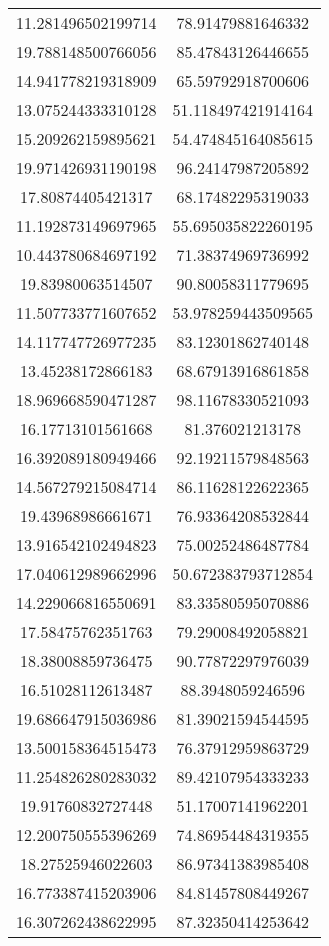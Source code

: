 \begin{table}
\begin{tabular}{cc}
11.281496502199714 & 78.91479881646332 \\
19.788148500766056 & 85.47843126446655 \\
14.941778219318909 & 65.59792918700606 \\
13.075244333310128 & 51.118497421914164 \\
15.209262159895621 & 54.474845164085615 \\
19.971426931190198 & 96.24147987205892 \\
17.80874405421317 & 68.17482295319033 \\
11.192873149697965 & 55.695035822260195 \\
10.443780684697192 & 71.38374969736992 \\
19.83980063514507 & 90.80058311779695 \\
11.507733771607652 & 53.978259443509565 \\
14.117747726977235 & 83.12301862740148 \\
13.45238172866183 & 68.67913916861858 \\
18.969668590471287 & 98.11678330521093 \\
16.17713101561668 & 81.376021213178 \\
16.392089180949466 & 92.19211579848563 \\
14.567279215084714 & 86.11628122622365 \\
19.43968986661671 & 76.93364208532844 \\
13.916542102494823 & 75.00252486487784 \\
17.040612989662996 & 50.672383793712854 \\
14.229066816550691 & 83.33580595070886 \\
17.58475762351763 & 79.29008492058821 \\
18.38008859736475 & 90.77872297976039 \\
16.51028112613487 & 88.3948059246596 \\
19.686647915036986 & 81.39021594544595 \\
13.500158364515473 & 76.37912959863729 \\
11.254826280283032 & 89.42107954333233 \\
19.91760832727448 & 51.17007141962201 \\
12.200750555396269 & 74.86954484319355 \\
18.27525946022603 & 86.97341383985408 \\
16.773387415203906 & 84.81457808449267 \\
16.307262438622995 & 87.32350414253642 \\

\end{tabular}
\end{table}
